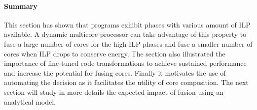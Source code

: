 \paragraph*{Summary}
This section has shown that programs exhibit phases with various amount of ILP available.
A dynamic multicore processor can take advantage of this property to fuse a large number of cores for the high-ILP phases and fuse a smaller number of cores when ILP drops to conserve energy.
The section also illustrated the importance of fine-tuned code transformations to achieve sustained performance and increase the potential for fusing cores.
Finally it motivates the use of automating the decision as it facilitates the utility of core composition.
The next section will study in more details the expected impact of fusion using an analytical model.

